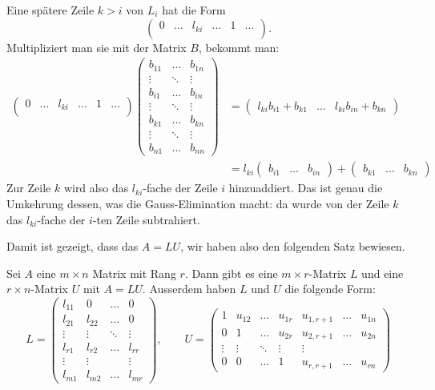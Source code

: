 Eine spätere Zeile $k>i$ von $L_i$ hat die Form
\[
\begin{pmatrix}
0&\dots&l_{ki}&\dots&1&\dots\\
\end{pmatrix}.
\]
Multipliziert man sie mit der Matrix $B$, bekommt man:
\begin{align*}
\begin{pmatrix}
0&\dots&l_{ki}&\dots&1&\dots\\
\end{pmatrix}
\begin{pmatrix}
b_{11}&\dots &b_{1n}\\
\vdots&\ddots&\vdots\\
b_{i1}&\dots &b_{in}\\
\vdots&\ddots&\vdots\\
b_{k1}&\dots&b_{kn}\\
\vdots&\ddots&\vdots\\
b_{n1}&\dots &b_{nn}
\end{pmatrix}
&=
\begin{pmatrix}
l_{ki}b_{i1}+b_{k1}
&\dots&
l_{ki}b_{in}+b_{kn}
\end{pmatrix}
\\
&=
l_{ki}
\begin{pmatrix}
b_{i1}
&\dots&
b_{in}
\end{pmatrix}
+
\begin{pmatrix}
b_{k1}
&\dots&
b_{kn}
\end{pmatrix}
\end{align*}
Zur Zeile $k$ wird also das $l_{ki}$-fache der Zeile
$i$ hinzuaddiert.
Das ist genau die Umkehrung dessen, was
die Gauss-Elimination macht: da wurde von der Zeile $k$
das $l_{ki}$-fache der $i$-ten Zeile subtrahiert.

Damit ist gezeigt, dass das $A=LU$, wir haben also den folgenden
Satz bewiesen.

\begin{satz}[LU-Zerlegung]
\label{ludecomposition}
Sei $A$ eine $m\times n$ Matrix mit Rang $r$.
Dann gibt es eine $m\times r$-Matrix $L$ und eine $r\times n$-Matrix
$U$ mit $A=LU$.
Ausserdem haben $L$ und $U$ die folgende Form:
\[
L=\begin{pmatrix}
l_{11}&0&\dots&0\\
l_{21}&l_{22}&\dots&0\\
\vdots&\vdots&\ddots&\vdots\\
l_{r1}&l_{r2}&\dots&l_{rr}\\
\vdots&\vdots& &\vdots\\
l_{m1}&l_{m2}&\dots&l_{mr}
\end{pmatrix},\qquad
U=\begin{pmatrix}
1&u_{12}&\dots&u_{1r}&u_{1,r+1}&\dots&u_{1n}\\
0&1     &\dots&u_{2r}&u_{2,r+1}&\dots&u_{2n}\\
\vdots&\vdots&\ddots&\vdots&\vdots\\
0&0&\dots&1&u_{r,r+1}&\dots&u_{rn}
\end{pmatrix}
\]
\end{satz}

